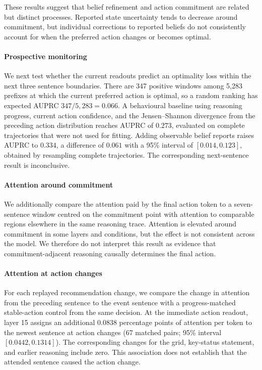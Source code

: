 \documentclass{article}
\begin{document}
These results suggest that belief refinement and action commitment are related
but distinct processes. Reported state uncertainty tends to decrease around
commitment, but individual corrections to reported beliefs do not consistently
account for when the preferred action changes or becomes optimal.

\paragraph{Prospective monitoring}
We next test whether the current readouts predict an optimality loss within the
next three sentence boundaries. There are 347 positive windows among 5,283
prefixes at which the current preferred action is optimal, so a random ranking
has expected AUPRC $347/5{,}283=0.066$. A behavioural baseline using reasoning
progress, current action confidence, and the Jensen--Shannon divergence from
the preceding action distribution reaches AUPRC of
$0.273$, evaluated on complete trajectories that were not used for fitting. Adding observable belief reports raises AUPRC to $0.334$, a
difference of $0.061$ with a 95\% interval of
$[0.014,0.123]$, obtained by resampling complete trajectories. The corresponding next-sentence result is inconclusive. 

\paragraph{Attention around commitment}


We additionally compare the attention paid by the final action token to a
seven-sentence window centred on the commitment point with attention to
comparable regions elsewhere in the same reasoning trace. Attention is
elevated around commitment in some layers and conditions, but the effect is
not consistent across the model. We therefore do not interpret this result as
evidence that commitment-adjacent reasoning causally determines the final
action.

\paragraph{Attention at action changes}
For each replayed recommendation change, we compare the change in attention from the preceding sentence to the event sentence with a progress-matched stable-action control from the same decision. At the immediate action readout, layer 15 assigns an additional $0.0838$ percentage points of attention per token to the newest sentence at action changes (67 matched pairs; 95\% interval $[0.0442,0.1314]$). The corresponding changes for the grid, key-status statement, and earlier reasoning include zero. This association does not establish that the attended sentence caused the action
change.
\end{document}
